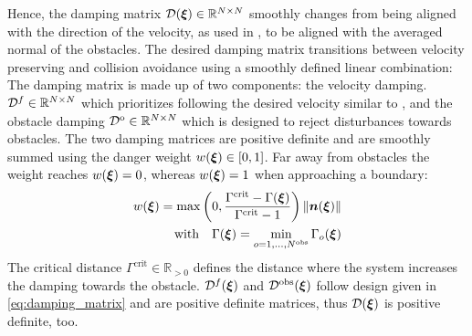Hence, the damping matrix $\mathcal{D}(\boldsymbol{\xi}) \in \mathbb{R}^{N \times N}$ smoothly changes from being aligned with the direction of the velocity, as used in \parencite{kronander2015passive}, to be aligned with the averaged normal of the obstacles. The desired damping matrix transitions between velocity preserving and collision avoidance using a smoothly defined linear combination:
The damping matrix is made up of two components: the velocity damping. $\mathcal{D}^f \in \mathbb{R}^{N \times N}$ which prioritizes following the desired velocity similar to \parencite{kronander2015passive}, and the obstacle damping $\mathcal{D}^{\mathrm{o}} \in \mathbb{R}^{N \times N}$ which is designed to reject disturbances towards obstacles. The two damping matrices are positive definite and are smoothly summed using the danger weight $w(\boldsymbol{\xi}) \in [0, 1]$. Far away from obstacles the weight reaches $w(\boldsymbol{\xi}) = 0$, whereas $w(\boldsymbol{\xi}) = 1$ when approaching a boundary:
\begin{equation}
  \begin{split}
w(\boldsymbol{\xi}) =
\max \left(0,  \frac{\Gamma^{\mathrm{crit}} - \Gamma(\boldsymbol{\xi})}{\Gamma^{\mathrm{crit}} - 1} \right) \| \boldsymbol{n}(\boldsymbol{\xi}) \| \\
\text{with} \quad
\Gamma(\boldsymbol{\xi}) = \min_{o = 1, ..., N^{\mathrm{obs}}} \Gamma_o(\boldsymbol{\xi})
\end{split}
\label{eq:weight_function}
\end{equation}
The critical distance \iflong $\Gamma^{\mathrm{crit}} \in \mathbb{R}_{>0}$ \fi defines the distance where the system increases the damping towards the obstacle.
${\mathcal{D}^f}(\boldsymbol{\xi})$ and $\mathcal{D^{\mathrm{obs}}}(\boldsymbol{\xi})$ follow design given in \eqref{eq:damping_matrix} and are positive definite matrices, thus $\mathcal{D}(\boldsymbol{\xi})$ is positive definite, too.

